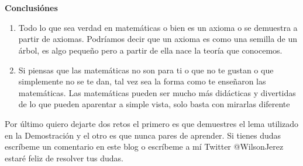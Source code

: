 \documentclass{article}
\begin{document}
\\ \\ 
\begin{center}
    \textbf{Conclusiónes}
\end{center}
     \begin{enumerate}
     \item Todo lo que sea verdad en matemáticas o bien es un axioma o se demuestra a partir de axiomas.
     Podríamos decir que un axioma es como una semilla de un árbol, es algo pequeño pero a partir de ella nace la teoría que conocemos. 
     \item Si piensas que las matemáticas no son para ti o que no te gustan o que simplemente no se te dan, tal vez sea la forma como te enseñaron
     las matemáticas. Las matemáticas pueden ser mucho más didácticas y divertidas de lo que pueden aparentar a simple vista, solo basta con mirarlas diferente
 \end{enumerate}
Por último quiero dejarte dos retos el primero es que demuestres el lema utilizado en la Demostración y el otro es que nunca pares de aprender. 
Si tienes dudas escríbeme un comentario en este blog o escríbeme a mí Twitter @WilsonJerez estaré feliz de resolver tus dudas.
\end{document}
